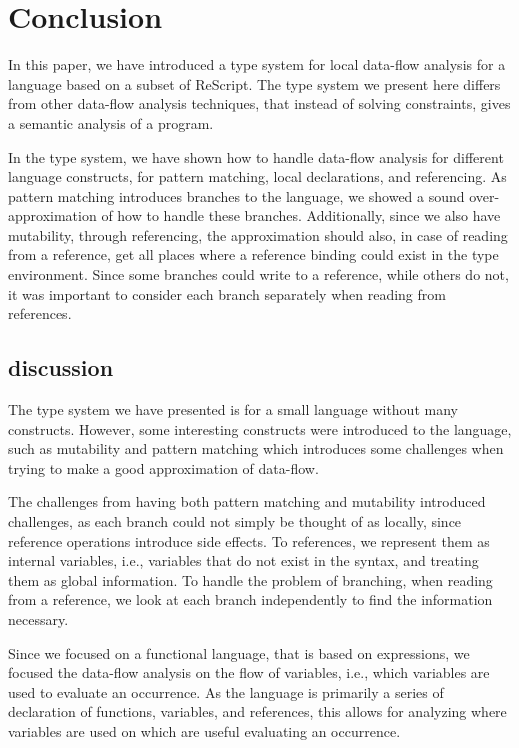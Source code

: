 \documentclass[../../master.tex]{subfiles}
\begin{document}
\section{Conclusion}\label{sec:Conc}
In this paper, we have introduced a type system for local data-flow analysis for a language based on a subset of ReScript.
The type system we present here differs from other data-flow analysis techniques, that instead of solving constraints, gives a semantic analysis of a program.

In the type system, we have shown how to handle data-flow analysis for different language constructs, for pattern matching, local declarations, and referencing.
As pattern matching introduces branches to the language, we showed a sound over-approximation of how to handle these branches.
Additionally, since we also have mutability, through referencing, the approximation should also, in case of reading from a reference, get all places where a reference binding could exist in the type environment.
Since some branches could write to a reference, while others do not, it was important to consider each branch separately when reading from references.

\subsection{discussion}
The type system we have presented is for a small language without many constructs.
However, some interesting constructs were introduced to the language, such as mutability and pattern matching which introduces some challenges when trying to make a good approximation of data-flow.

The challenges from having both pattern matching and mutability introduced challenges, as each branch could not simply be thought of as locally, since reference operations introduce side effects.
To references, we represent them as internal variables, i.e., variables that do not exist in the syntax, and treating them as global information.
To handle the problem of branching, when reading from a reference, we look at each branch independently to find the information necessary.
\bigskip

Since we focused on a functional language, that is based on expressions, we focused the data-flow analysis on the flow of variables, i.e., which variables are used to evaluate an occurrence.
As the language is primarily a series of declaration of functions, variables, and references, this allows for analyzing where variables are used on which are useful evaluating an occurrence.
\end{document}
